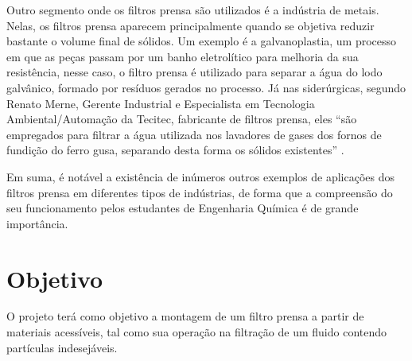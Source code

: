 Outro segmento onde os filtros prensa são utilizados é a indústria de metais.
Nelas, os filtros prensa aparecem principalmente quando se objetiva reduzir
bastante o volume final de sólidos. Um exemplo é a galvanoplastia, um processo
em que as peças passam por um banho eletrolítico para melhoria da sua
resistência, nesse caso, o filtro prensa é utilizado para separar a água do lodo
galvânico, formado por resíduos gerados no processo. Já nas siderúrgicas,
segundo Renato Merne, Gerente Industrial e Especialista em Tecnologia
Ambiental/Automação da Tecitec, fabricante de filtros prensa, eles ``são
empregados para filtrar a água utilizada nos lavadores de gases dos fornos de
fundição do ferro gusa, separando desta forma os sólidos existentes''
.

Em suma, é notável a existência de inúmeros outros exemplos de aplicações dos
filtros prensa em diferentes tipos de indústrias, de forma que a compreensão do
seu funcionamento pelos estudantes de Engenharia Química é de grande
importância.

\section{Objetivo}\label{sec:objetivos} 

O projeto terá como objetivo a montagem de um filtro prensa a partir de
materiais acessíveis, tal como sua operação na filtração de um fluido contendo
partículas indesejáveis.


